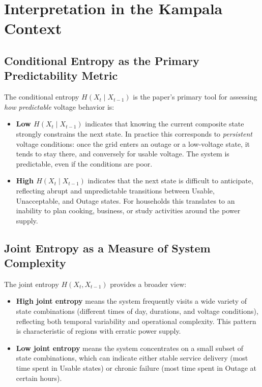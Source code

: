 \documentclass[11pt]{article}
\begin{document}
\section{Interpretation in the Kampala Context}

\subsection{Conditional Entropy as the Primary Predictability Metric}

The conditional entropy $H(X_t \mid X_{t-1})$ is the paper's primary tool for assessing \emph{how predictable} voltage behavior is:

\begin{itemize}
    \item \textbf{Low $H(X_t \mid X_{t-1})$} indicates that knowing the current composite state strongly constrains the next state. In practice this corresponds to \emph{persistent} voltage conditions: once the grid enters an outage or a low-voltage state, it tends to stay there, and conversely for usable voltage. The system is predictable, even if the conditions are poor.
    \item \textbf{High $H(X_t \mid X_{t-1})$} indicates that the next state is difficult to anticipate, reflecting abrupt and unpredictable transitions between Usable, Unacceptable, and Outage states. For households this translates to an inability to plan cooking, business, or study activities around the power supply.
\end{itemize}

\subsection{Joint Entropy as a Measure of System Complexity}

The joint entropy $H(X_t, X_{t-1})$ provides a broader view:

\begin{itemize}
    \item \textbf{High joint entropy} means the system frequently visits a wide variety of state combinations (different times of day, durations, and voltage conditions), reflecting both temporal variability and operational complexity. This pattern is characteristic of regions with erratic power supply.
    \item \textbf{Low joint entropy} means the system concentrates on a small subset of state combinations, which can indicate either stable service delivery (most time spent in Usable states) or chronic failure (most time spent in Outage at certain hours).
\end{itemize}
\end{document}
